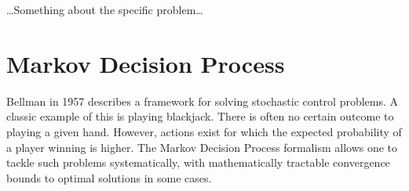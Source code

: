 \ldots Something about the specific problem\ldots




\section{Markov Decision Process}

Bellman\cite{bellamn1957mdp} in 1957 describes a framework for solving stochastic control problems. A classic example of this is playing blackjack. There is often no certain outcome to playing a given hand. However, actions exist for which the expected probability of a player winning is higher. The Markov Decision Process formalism allows one to tackle such problems systematically, with mathematically tractable convergence bounds to optimal solutions in some cases.

